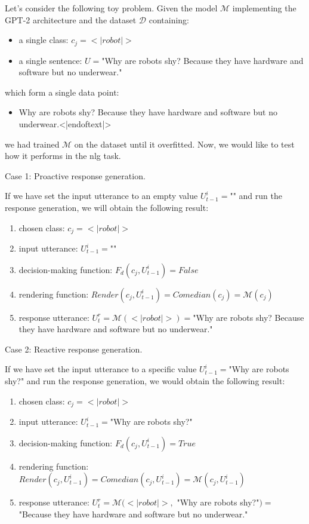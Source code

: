 Let's consider the following toy problem. Given the model \( \mathcal{M}\) implementing the GPT-2 architecture and the dataset \( \mathcal{D}\) containing:
\begin{itemize}
    \item a single class: \( c_j = <|robot|>\)
    \item a single sentence: \( U = \)"Why are robots shy? Because they have hardware and software but no underwear."
\end{itemize}
which form a single data point:
\begin{itemize}
    \item<|robot|>Why are robots shy? Because they have hardware and software but no underwear.<|endoftext|>
\end{itemize}
we had trained \( \mathcal{M}\) on the dataset until it overfitted. Now, we would like to test how it performs in the \acrshort{nlg} task.

Case 1: Proactive response generation.

If we have set the input utterance to an empty value \( U_{t-1}^i = \)"" and run the response generation, we will obtain the following result:
\begin{enumerate}
    \item chosen class: \( c_j = <|robot|>\)
    \item input utterance: \( U_{t-1}^i = \)""
    \item decision-making function: \( F_d(c_j, U_{t-1}^i) = False\)
    \item rendering function: \( Render(c_j, U_{t-1}^i) = Comedian(c_j) = \mathcal{M}(c_j)\)
    \item response utterance: \( U_t^r = \mathcal{M}(<|robot|>) = \)"Why are robots shy? Because they have hardware and software but no underwear."
\end{enumerate}

Case 2: Reactive response generation.

If we have set the input utterance to a specific value \( U_{t-1}^i = \)"Why are robots shy?" and run the response generation, we would obtain the following result:
\begin{enumerate}
    \item chosen class: \( c_j =  <|robot|>\)
    \item input utterance: \( U_{t-1}^i = \)"Why are robots shy?"
    \item decision-making function: \( F_d(c_j, U_{t-1}^i) = True\)
    \item rendering function: \( Render(c_j, U_{t-1}^i) = Comedian(c_j, U_{t-1}^i) = \mathcal{M}(c_j, U_{t-1}^i)\)
    \item response utterance: \( U_t^r = \mathcal{M}(<|robot|>,\) "Why are robots shy?"\() = \)"Because they have hardware and software but no underwear."
\end{enumerate}

